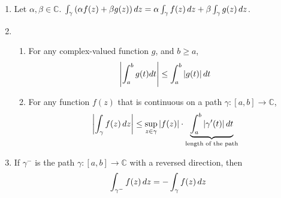 \documentclass[11pt, oneside]{book}
\begin{document}
\begin{propo}\label{propo:properties_of_integrals_in_c}
	\begin{enumerate}
		\item {} Let $\alpha, \beta \in \mathbb{C}$. $\int_{\gamma} \left(\alpha f(z) + \beta g(z) \right) \mathop{}\!d{z} = \alpha \int_{\gamma} f(z) \mathop{}\!d{z} + \beta \int_{\gamma} g(z) \mathop{}\!d{z}$. \label{item:linearity_property_of_integrals}
		\item \begin{enumerate}
			\item For any complex-valued function $g$, and $b \geq a$,
				\begin{equation*}
					\left|\int_{a}^{b} g(t) dt\right| \leq \int_{a}^{b} \left|g(t)\right| dt
				\end{equation*} \label{item:absval_integral_less_than_integral_absval}
			\item For any function $f(z)$ that is continuous on a path $\gamma: [a, b] \to \mathbb{C}$,
					\begin{equation*}
						\left|\int_{\gamma} f(z) \mathop{}\!d{z}\right| \leq \sup_{z \in \gamma} \left|f(z)\right| \cdot \underbrace{\int_{a}^{b} \left|\gamma'(t)\right| dt}_{\text{length of the path}}
					\end{equation*}\label{item:absval_integral_less_than_fnsup_times_arc_length}
		\end{enumerate}
		\item If $\gamma^-$ is the path $\gamma: [a, b] \to \mathbb{C}$ with a reversed direction, then
			\begin{equation*}
				\int_{\gamma^-} f(z) \mathop{}\!d{z} = - \int_{\gamma} f(z) \mathop{}\!d{z}
			\end{equation*}\label{item:reversed_path_orientation_gives_negative_integral}
	\end{enumerate}
\end{propo}
\end{document}
